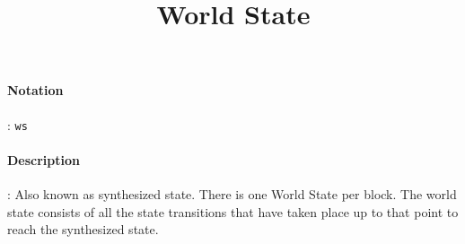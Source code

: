 \documentclass[10pt,a4paper,oneside]{scrartcl}
\author{}
\title{World State}
\date{}
\begin{document}
\maketitle
\paragraph{Notation}: \texttt{ws}
\paragraph{Description}: Also known as synthesized state. There is one World State per block. The world state consists of all the state transitions that have taken place up to that point to reach the synthesized state.

\printbibliography
\end{document}
